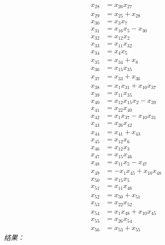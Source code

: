 \documentclass[11pt]{article}
\begin{document}
\begin{align*}
x_{28} &= x_{26} x_{27} \\
x_{29} &= x_{25} + x_{28} \\
x_{30} &= x_{3} x_{7} \\
x_{31} &= x_{16} x_{5} - x_{30} \\
x_{32} &= x_{12} x_{2} \\
x_{33} &= x_{11} x_{32} \\
x_{34} &= x_{4} x_{5} \\
x_{35} &= x_{34} + x_{8} \\
x_{36} &= x_{15} x_{35} \\
x_{37} &= x_{33} + x_{36} \\
x_{38} &= x_{1} x_{31} + x_{10} x_{37} \\
x_{39} &= x_{11} x_{35} \\
x_{40} &= x_{12} x_{15} x_{2} - x_{39} \\
x_{41} &= x_{22} x_{40} \\
x_{42} &= x_{1} x_{37} - x_{10} x_{31} \\
x_{43} &= x_{26} x_{42} \\
x_{44} &= x_{41} + x_{43} \\
x_{45} &= x_{12} x_{6} \\
x_{46} &= x_{12} x_{3} \\
x_{47} &= x_{15} x_{46} \\
x_{48} &= x_{11} x_{5} - x_{47} \\
x_{49} &= - x_{1} x_{45} + x_{10} x_{48} \\
x_{50} &= x_{15} x_{5} \\
x_{51} &= x_{11} x_{46} \\
x_{52} &= x_{50} + x_{51} \\
x_{53} &= x_{22} x_{52} \\
x_{54} &= x_{1} x_{48} + x_{10} x_{45} \\
x_{55} &= x_{26} x_{54} \\
x_{56} &= x_{53} + x_{55}
\end{align*}
\textit{结果：}
\end{document}
